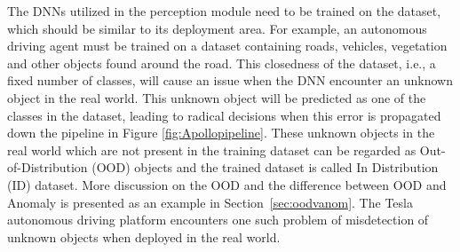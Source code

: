 The DNNs utilized in the perception module need to be trained on the dataset, which should be similar to its deployment area.
For example, an autonomous driving agent must be trained on a dataset containing roads, vehicles, vegetation and other objects found around the road.
This closedness of the dataset, i.e., a fixed number of classes, will cause an issue when the DNN encounter an unknown object in the real world.
This unknown object will be predicted as one of the classes in the dataset, leading to radical decisions when this error is propagated down the pipeline in Figure \ref{fig:Apollopipeline}.
These unknown objects in the real world which are not present in the training dataset can be regarded as Out-of-Distribution (OOD) objects and the trained dataset is called In Distribution (ID) dataset. 
More discussion on the OOD and the difference between OOD and Anomaly is presented as an example in Section~\ref{sec:oodvanom}.
The Tesla autonomous driving platform encounters one such problem of misdetection of unknown objects when deployed in the real world.
